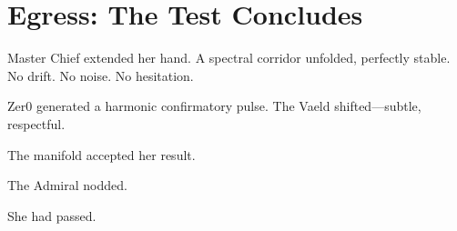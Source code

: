 \section*{Egress: The Test Concludes}
Master Chief extended her hand. A spectral corridor unfolded, perfectly stable.
No drift. No noise. No hesitation.

Zer0 generated a harmonic confirmatory pulse.
The Vaeld shifted—subtle, respectful.

The manifold accepted her result.

The Admiral nodded.

She had passed.
